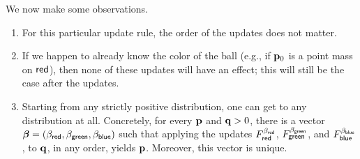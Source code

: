 \documentclass{article}
\begin{document}
\begin{examplex}


    We now make some observations.
    \begin{enumerate}
        \item For this particular update rule, the order of the updates does not matter.
        \item If we happen to already know the color of the ball (e.g., if $\mathbf{p}_0$ is a point mass on ${\mathsf{red}}$), then none of these updates will have an effect; this will still be the case after the updates.
        \item Starting from any strictly positive distribution, one can get to any distribution at all.
        Concretely, for every $\mathbf{p}$ and $\mathbf{q} > 0$, there is a vector
        $\boldsymbol\beta
        = (\beta_{{\mathsf{red}}}, \beta_{{\mathsf{green}}}, \beta_{{\mathsf{blue}}})$
        such that applying the updates
        $F^{\beta_{{\mathsf{red}}}
            }_{{\mathsf{red}}}$,
        $F^{\beta_{{\mathsf{green}}}
            }_{{\mathsf{green}}}$, and
        $F^{\beta_{{\mathsf{blue}}}
            }_{{\mathsf{blue}}}$,
        to $\mathbf{q}$, in any order, yields $\mathbf{p}$. Moreover, this vector is unique.


    \end{enumerate}

\end{examplex}

\begin{example}

\end{example}
\end{document}
